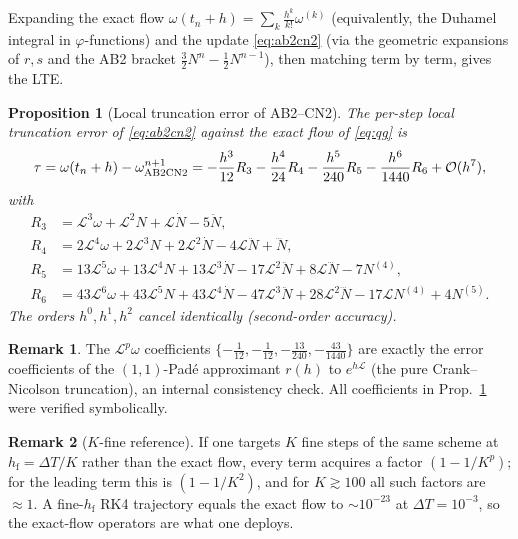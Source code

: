 \documentclass[11pt]{article}
\theoremstyle{plain}
\newtheorem{proposition}{Proposition}
\theoremstyle{definition}
\newtheorem{remark}{Remark}
\newcommand{\Lop}{\mathcal{L}}
\newcommand{\Ndot}{\dot{N}}
\newcommand{\Nddot}{\ddot{N}}
\newcommand{\Ndddot}{\dddot{N}}
\newcommand{\bO}{\mathcal{O}}
\newcommand{\DT}{\Delta T}
\newcommand{\hf}{h_{\mathrm{f}}}
\begin{document}
Expanding the exact flow $\omega(t_n+h)=\sum_k\frac{h^k}{k!}\omega^{(k)}$
(equivalently, the Duhamel integral in $\varphi$-functions) and the update
\eqref{eq:ab2cn2} (via the geometric expansions of $r,s$ and the AB2 bracket
$\tfrac32N^n-\tfrac12N^{n-1}$), then matching term by term, gives the LTE.

\begin{proposition}[Local truncation error of AB2--CN2]
\label{prop:lte}
The per-step local truncation error of \eqref{eq:ab2cn2} against the exact flow
of \eqref{eq:qg} is
\begin{equation}
\tau=\omega(t_n+h)-\omega^{n+1}_{\rm AB2CN2}
=-\frac{h^3}{12}R_3-\frac{h^4}{24}R_4-\frac{h^5}{240}R_5
 -\frac{h^6}{1440}R_6+\bO(h^7),
\label{eq:tau}
\end{equation}
with
\begin{align}
R_3 &= \Lop^3\omega+\Lop^2N+\Lop\Ndot-5\Nddot,\label{eq:R3}\\
R_4 &= 2\Lop^4\omega+2\Lop^3N+2\Lop^2\Ndot-4\Lop\Nddot+\Ndddot,\\
R_5 &= 13\Lop^5\omega+13\Lop^4N+13\Lop^3\Ndot-17\Lop^2\Nddot+8\Lop\Ndddot-7N^{(4)},\\
R_6 &= 43\Lop^6\omega+43\Lop^5N+43\Lop^4\Ndot-47\Lop^3\Nddot+28\Lop^2\Ndddot
        -17\Lop N^{(4)}+4N^{(5)}.
\end{align}
The orders $h^0,h^1,h^2$ cancel identically (second-order accuracy).
\end{proposition}

\begin{remark}
The $\Lop^p\omega$ coefficients $\{-\tfrac1{12},-\tfrac1{12},-\tfrac{13}{240},
-\tfrac{43}{1440}\}$ are exactly the error coefficients of the $(1,1)$-Pad\'e
approximant $r(h)$ to $e^{h\Lop}$ (the pure Crank--Nicolson truncation), an
internal consistency check. All coefficients in Prop.~\ref{prop:lte} were
verified symbolically.
\end{remark}

\begin{remark}[$K$-fine reference]
If one targets $K$ fine steps of the same scheme at $\hf=\DT/K$ rather than the
exact flow, every term acquires a factor $(1-1/K^p)$; for the leading term this
is $(1-1/K^2)$, and for $K\gtrsim100$ all such factors are $\approx1$. A
fine-$\hf$ RK4 trajectory equals the exact flow to $\sim10^{-23}$ at
$\DT=10^{-3}$, so the exact-flow operators are what one deploys.
\end{remark}
\end{document}
